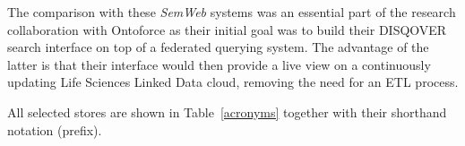 The comparison with these \emph{SemWeb} systems was an essential part of the research collaboration with Ontoforce as their initial goal was to build their DISQOVER search interface on top of a federated querying system. The advantage of the latter is that their interface would then provide a live view on a continuously updating Life Sciences Linked Data cloud, removing the need for an ETL process.

All selected stores are shown in Table~\ref{acronyms} together with their shorthand notation (prefix).

\begin{table}[ht!]
	\centering
	\caption{List of the tested systems and their acronyms.}
	\label{acronyms}

\end{table}